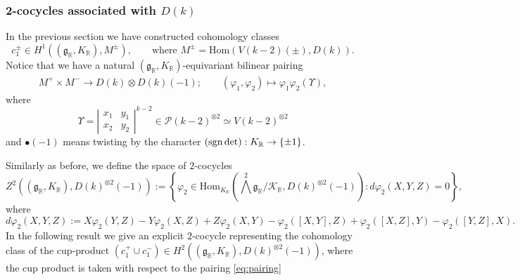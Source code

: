 \documentclass{amsart}
\theoremstyle{definition}
\theoremstyle{remark}
\numberwithin{equation}{section}
\newcommand{\R}{{\mathbb R}}
\newcommand{\cK}{{\mathcal K}}
\newcommand{\cP}{{\mathcal P}}
\newcommand{\mfg}{{\mathfrak g}}
\newcommand{\Hom}{{\mathrm {Hom}}}
\begin{document}
\subsubsection{2-cocycles associated with $D(k)$}

In the previous section we have constructed cohomology classes
\[
c_1^\pm\in H^1((\mfg_\R,K_\R),M^\pm), \qquad \text{where }  M^\pm=\Hom(V(k-2)(\pm),D(k)).
\]
Notice that we have a natural $(\mfg_\R,K_\R)$-equivariant bilinear pairing
\begin{align}\label{eq:pairing}
M^+\times M^-\longrightarrow D({ k})\otimes D({ k})(-1);\qquad (\varphi_1,\varphi_2)\mapsto\varphi_1\varphi_2(\Upsilon), 
\end{align}
where $$\Upsilon=\left|\begin{array}{cc}
    x_1 & y_1 \\
     x_2 &  y_2
\end{array}\right|^{k-2}\in\cP(k-2)^{\otimes 2}\simeq V(k-2)^{\otimes 2}$$ and $\bullet(-1)$ means twisting by the character $({\rm sgn}\det):K_\R\rightarrow\{\pm 1\}$. 

Similarly as before, we define the space of $2$-cocycles
\begin{equation}\label{def2cocycles}
 Z^2((\mfg_\R,K_\R),D(k)^{\otimes 2}(-1)):=\left\{\varphi_2\in \Hom_{K_\R}\left(\bigwedge^2\mfg_\R/\cK_\R,D(k)^{\otimes 2}(-1)\right)\colon  d\varphi_2(X,Y,Z)=0\right\},
\end{equation}
where $$d\varphi_2(X,Y,Z):=X\varphi_2(Y,Z)-Y\varphi_2(X,Z)+Z\varphi_2(X,Y)-\varphi_2([X,Y],Z)+\varphi_2([X,Z],Y)-\varphi_2([Y,Z],X).$$
In the following result we give an explicit $2$-cocycle representing the cohomology class of the cup-product $(c_1^+\cup c_1^-)\in H^2((\mfg_\R,K_\R),D(k)^{\otimes 2}(-1))$, where the cup product is taken with respect to the pairing \eqref{eq:pairing}
\end{document}
